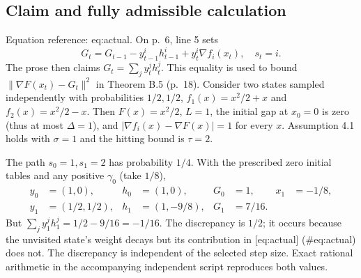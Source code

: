 \documentclass[10pt]{article}
\begin{document}
\subsection*{Claim and fully admissible calculation}
Equation reference: eq:actual. On p. 6, line 5 sets \[
 G_t=G_{t-1}-y_{t-1}^i h_{t-1}^i+y_t^i\nabla f_i(x_t),
 \quad s_t=i.\] The prose then claims \(G_t=\sum_jy_t^jh_t^j\). This equality is used to bound \(\|\nabla F(x_t)-G_t\|^2\) in Theorem B.5 (p. 18). Consider two states sampled independently with probabilities \(1/2,1/2\), \(f_1(x)=x^2/2+x\) and \(f_2(x)=x^2/2-x\). Then \(F(x)=x^2/2\), \(L=1\), the initial gap at \(x_0=0\) is zero (thus at most \(\Delta=1\)), and \(|\nabla f_i(x)-\nabla F(x)|=1\) for every \(x\). Assumption 4.1 holds with \(\sigma=1\) and the hitting bound is \(\tau=2\).\par
The path \(s_0=1,s_1=2\) has probability \(1/4\). With the prescribed zero initial tables and any positive \(\gamma_0\) (take \(1/8\)), \[\begin{aligned}
 y_0&=(1,0),&h_0&=(1,0),&G_0&=1,&x_1&=-1/8,\\
 y_1&=(1/2,1/2),&h_1&=(1,-9/8),&G_1&=7/16.\end{aligned}\] But \(\sum_jy_1^jh_1^j=1/2-9/16=-1/16\). The discrepancy is \(1/2\); it occurs because the unvisited state’s weight decays but its contribution in [eq:actual] (\#eq:actual) does not. The discrepancy is independent of the selected step size. Exact rational arithmetic in the accompanying independent script reproduces both values.\par
\end{document}
